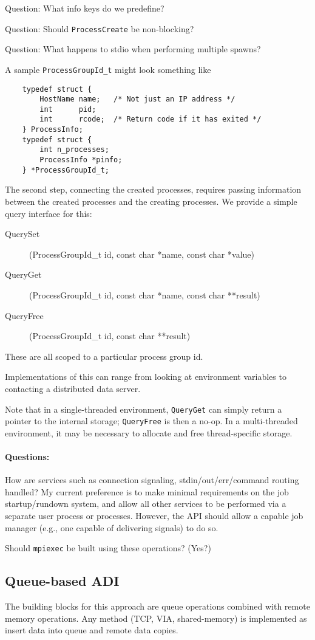 \documentclass{article}
\let\code=\texttt
\def\questions{\ifvmode\else\par\fi\paragraph*{Questions:}}
\begin{document}
Question: What info keys do we predefine?

Question: Should \code{ProcessCreate} be non-blocking?  

Question: What happens to stdio when performing multiple spawns?

A sample \code{ProcessGroupId\_t} might look something like
\begin{verbatim}
    typedef struct {
        HostName name;   /* Not just an IP address */
        int      pid;
        int      rcode;  /* Return code if it has exited */
    } ProcessInfo;
    typedef struct {
        int n_processes;
        ProcessInfo *pinfo;
    } *ProcessGroupId_t;
\end{verbatim}

The second step, connecting the created processes, requires passing
information between the created processes and the creating processes.  We
provide a simple query interface for this:
\begin{description}
\item[QuerySet](ProcessGroupId\_t id, const char *name, const char *value)\\
\item[QueryGet](ProcessGroupId\_t id, const char *name, const char **result)\\
\item[QueryFree](ProcessGroupId\_t id, const char **result)\\
\end{description}
These are all scoped to a particular process group id.

Implementations of this can range from looking at environment variables to
contacting a distributed data server.

Note that in a single-threaded environment, \code{QueryGet} can simply return
a pointer to the internal storage; \code{QueryFree} is then a no-op.  In a
multi-threaded environment, it may be necessary to allocate and free
thread-specific storage.

\questions
How are services such as connection signaling, stdin/out/err/command routing
handled?   My current preference is to make minimal requirements on the job
startup/rundown system, and allow all other services to be performed via a
separate user process or processes.  However, the API should allow a capable
job manager (e.g., one capable of delivering signals) to do so.

Should \code{mpiexec} be built using these operations? (Yes?)

\subsection{Queue-based ADI}
The building blocks for this approach are queue operations combined with
remote memory operations.  Any method (TCP, VIA, shared-memory) is implemented
as insert data into queue and remote data copies.
\end{document}
